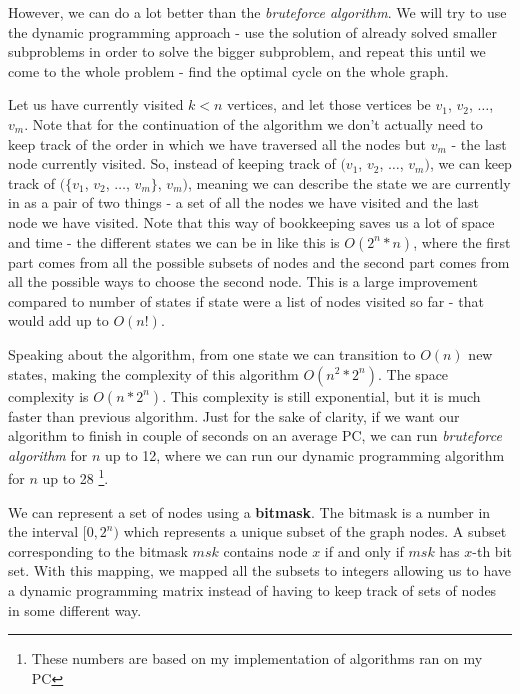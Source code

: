 \documentclass[12pt,twoside,notitlepage]{report}
\begin{document}
However, we can do a lot better than the {\it bruteforce algorithm}. We will try to use the dynamic programming approach - use the solution of already solved smaller subproblems in order to solve the bigger subproblem, and repeat this until we come to the whole problem - find the optimal cycle on the whole graph. 

\smallskip

Let us have currently visited $k < n$ vertices, and let those vertices be $v_{1}$, $v_{2}$, $\dots$, $v_{m}$. Note that for the continuation of the algorithm we don't actually need to keep track of the order in which we have traversed all the nodes but $v_{m}$ - the last node currently visited. So, instead of keeping track of $(v_{1}$, $v_{2}$, $\dots$, $v_{m})$, we can keep track of $(\{v_{1}$, $v_{2}$, $\dots$, $v_{m}\}$, $v_{m})$, meaning we can describe the state we are currently in as a pair of two things - a set of all the nodes we have visited and the last node we have visited. Note that this way of bookkeeping saves us a lot of space and time - the different states we can be in like this is $O(2^{n} * n)$, where the first part comes from all the possible subsets of nodes and the second part comes from all the possible ways to choose the second node. This is a large improvement compared to number of states if state were a list of nodes visited so far - that would add up to $O(n!)$.

\smallskip

Speaking about the algorithm, from one state we can transition to $O(n)$ new states, making the complexity of this algorithm $O(n^2 * 2^n)$. The space complexity is $O(n * 2^n)$. This complexity is still exponential, but it is much faster than previous algorithm. Just for the sake of clarity, if we want our algorithm to finish in couple of seconds on an average PC, we can run {\it bruteforce algorithm} for $n$ up to 12, where we can run our dynamic programming algorithm for $n$ up to 28 \footnote{These numbers are based on my implementation of algorithms ran on my PC}.

\smallskip

We can represent a set of nodes using a {\bf bitmask}. The bitmask is a number in the interval $[0, 2^{n})$ which represents a unique subset of the graph nodes. A subset corresponding to the bitmask $msk$ contains node $x$ if and only if $msk$ has $x$-th bit set. With this mapping, we mapped all the subsets to integers allowing us to have a dynamic programming matrix instead of having to keep track of sets of nodes in some different way.
\end{document}
